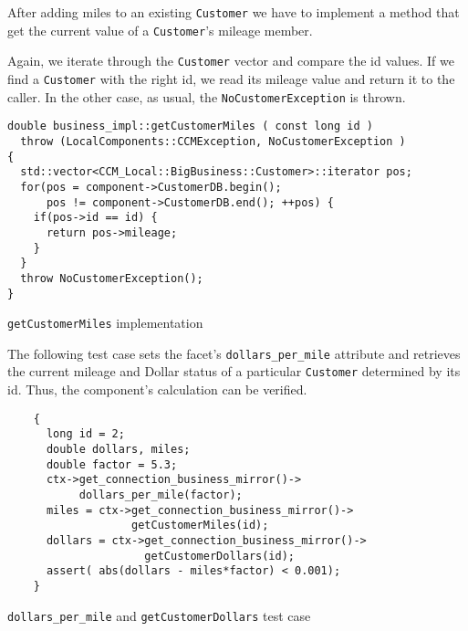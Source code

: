 After adding miles to an existing {\tt Customer} we have to implement a method
that get the current value of a {\tt Customer}'s mileage member.

Again, we iterate through the {\tt Customer} vector and compare the id values.
If we find a {\tt Customer} with the right id, we read its mileage value and
return it to the caller.
In the other case, as usual, the {\tt NoCustomerException} is thrown.

\begin{Example}
\begin{minifbox}
\begin{small}
\begin{verbatim}
double business_impl::getCustomerMiles ( const long id )
  throw (LocalComponents::CCMException, NoCustomerException )
{
  std::vector<CCM_Local::BigBusiness::Customer>::iterator pos;
  for(pos = component->CustomerDB.begin(); 
      pos != component->CustomerDB.end(); ++pos) {
    if(pos->id == id) {
      return pos->mileage;
    }
  }
  throw NoCustomerException(); 
}
\end{verbatim}
\end{small}
\end{minifbox}
\caption{{\tt getCustomerMiles} implementation}
\label{example:}
\end{Example}


The following test case sets the facet's {\tt dollars\_per\_mile} attribute
and retrieves the current mileage and Dollar status of a particular 
{\tt Customer} determined by its id.
Thus, the component's calculation can be verified.

\begin{Example}
\begin{minifbox}
\begin{small}
\begin{verbatim}
    {
      long id = 2;
      double dollars, miles;
      double factor = 5.3;
      ctx->get_connection_business_mirror()->
           dollars_per_mile(factor);
      miles = ctx->get_connection_business_mirror()->
                   getCustomerMiles(id);
      dollars = ctx->get_connection_business_mirror()->
                     getCustomerDollars(id); 
      assert( abs(dollars - miles*factor) < 0.001);
    }
\end{verbatim}
\end{small}
\end{minifbox}
\caption{{\tt dollars\_per\_mile} and {\tt getCustomerDollars} test case}
\label{example:}
\end{Example}



